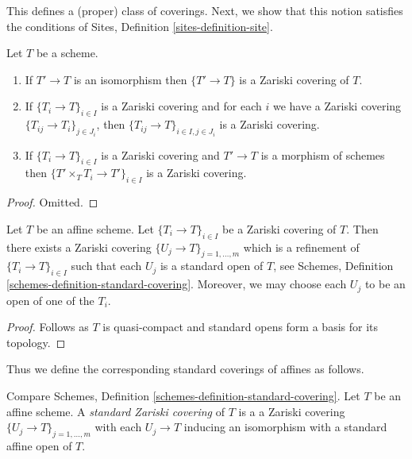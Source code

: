 \noindent
This defines a (proper) class of coverings.
Next, we show that this notion satisfies the conditions of
Sites, Definition \ref{sites-definition-site}.

\begin{lemma}
\label{lemma-zariski}
Let $T$ be a scheme.
\begin{enumerate}
\item If $T' \to T$ is an isomorphism then $\{T' \to T\}$
is a Zariski covering of $T$.
\item If $\{T_i \to T\}_{i\in I}$ is a Zariski covering and for each
$i$ we have a Zariski covering $\{T_{ij} \to T_i\}_{j\in J_i}$, then
$\{T_{ij} \to T\}_{i \in I, j\in J_i}$ is a Zariski covering.
\item If $\{T_i \to T\}_{i\in I}$ is a Zariski covering
and $T' \to T$ is a morphism of schemes then
$\{T' \times_T T_i \to T'\}_{i\in I}$ is a Zariski covering.
\end{enumerate}
\end{lemma}

\begin{proof}
Omitted.
\end{proof}

\begin{lemma}
\label{lemma-zariski-affine}
Let $T$ be an affine scheme. Let $\{T_i \to T\}_{i \in I}$ be a
Zariski covering of $T$. Then there exists a Zariski covering
$\{U_j \to T\}_{j = 1, \ldots, m}$ which is a refinement
of $\{T_i \to T\}_{i \in I}$ such that each $U_j$ is a standard
open of $T$, see
Schemes, Definition \ref{schemes-definition-standard-covering}.
Moreover, we may choose each $U_j$ to be an open of one of the $T_i$.
\end{lemma}

\begin{proof}
Follows as $T$ is quasi-compact and standard opens form a basis
for its topology.
\end{proof}

\noindent
Thus we define the corresponding standard coverings of affines as follows.

\begin{definition}
\label{definition-standard-Zariski}
Compare Schemes, Definition \ref{schemes-definition-standard-covering}.
Let $T$ be an affine scheme. A {\it standard Zariski covering}
of $T$ is a a Zariski covering $\{U_j \to T\}_{j = 1, \ldots, m}$
with each $U_j \to T$ inducing an isomorphism with a standard affine open
of $T$.
\end{definition}


